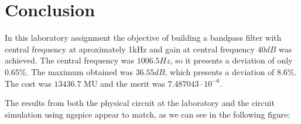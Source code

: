 \section{Conclusion}
\label{sec:conclusion}

In this laboratory assignment the objective of building a bandpass filter with central frequency at aproximately 1kHz and gain at central frequency $40dB$ was achieved. The central frequency was $1006.5 Hz$, so it presents a deviation of only $0.65 \%$.
The maximum obtained was $36.55dB$, which presents a deviation of $8.6 \%$. The cost was $13436.7$ MU and the merit was $7.487043\cdot10^{-6}$.
 
The results from both the physical circuit at the laboratory and the circuit
simulation using ngspice appear to match, as we can see in the following figure:



